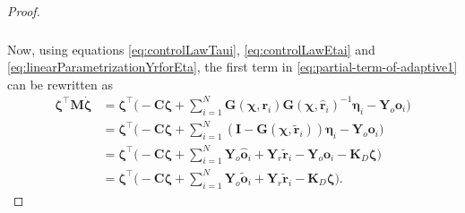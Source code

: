 \begin{proof}
\begin{align}
\begin{split}
    \end{split} \label{eq:partial-term-of-adaptive1}
    \end{align} 
    Now, using equations \eqref{eq:controlLawTaui}, \eqref{eq:controlLawEtai} and \eqref{eq:linearParametrizationYrforEta}, the first term in \eqref{eq:partial-term-of-adaptive1} can be rewritten as
    \begin{align}
        \boldsymbol{\zeta}^\top \mathbf {M} \dot{\boldsymbol{\zeta}} &= \boldsymbol{\zeta}^\top\Biggl( - \mathbf{C}\boldsymbol{\zeta} + \sum_{i=1}^N\mathbf{G}(\boldsymbol{\chi}, \mathbf{r}_i)\mathbf{G}(\boldsymbol{\chi}, \hat{\mathbf{r}}_i)^{-1}\boldsymbol{\eta}_i - \mathbf{Y}_o\mathbf{o}_i\Biggr)\\
        &= \boldsymbol{\zeta}^\top\Biggl(- \mathbf{C}\boldsymbol{\zeta}+\sum_{i=1}^N(\mathbf{I}-\mathbf{G}(\boldsymbol{\chi}, \widetilde{\mathbf{r}}_i))\boldsymbol{\eta}_i - \mathbf{Y}_o\mathbf{o}_i \Biggr)\\
        &= \boldsymbol{\zeta}^\top\Biggl(- \mathbf{C}\boldsymbol{\zeta} + \sum_{i=1}^N \mathbf{Y}_o\hat{\mathbf{o}}_i + \mathbf{Y}_r\widetilde{\mathbf{r}}_i - \mathbf{Y}_o\mathbf{o}_i- \mathbf{K}_D\boldsymbol{\zeta} \Biggr)\\
        &= \boldsymbol{\zeta}^\top\Biggl(- \mathbf{C}\boldsymbol{\zeta} + \sum_{i=1}^N \mathbf{Y}_o\widetilde{\mathbf{o}}_i + \mathbf{Y}_r\widetilde{\mathbf{r}}_i - \mathbf{K}_D\boldsymbol{\zeta} \Biggr). \label{eq:partial-term-of-adaptive2}
    \end{align}


\end{proof}

